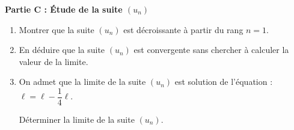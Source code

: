 \medskip

\textbf{Partie C : Étude de la suite \boldmath$\left(u_{n}\right)$\unboldmath}

\medskip

\begin{enumerate}
\item Montrer que la suite $\left(u_{n}\right)$ est décroissante à partir du rang $n = 1$.
\item En déduire que la suite $\left(u_{n}\right)$ est convergente sans chercher à calculer la valeur de la limite.
\item On admet que la limite de la suite $\left(u_{n}\right)$ est solution de l'équation : $\ell=\ell-\dfrac{1}{4} \ell$.

Déterminer la limite de la suite $\left(u_{n}\right)$.
\end{enumerate}
